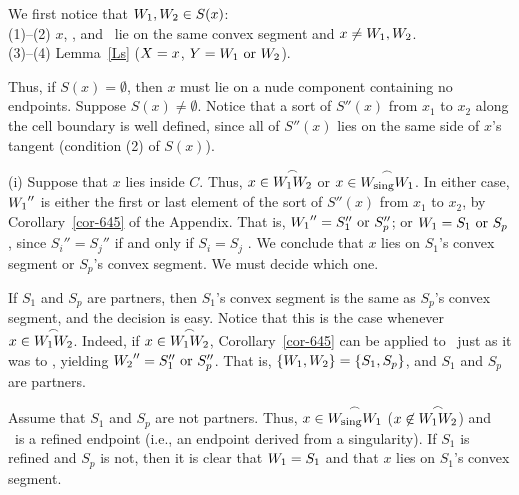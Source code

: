 We first notice that $\mbox{$W_{1}$},\mbox{$W_{2}$} \in S(x)$:\\
\indent (1)--(2) $x$, \wo, and \wt\ lie on the same convex segment 
and $x \neq \mbox{$W_{1}$},\mbox{$W_{2}$}$.\\
\indent (3)--(4) Lemma~\ref{Ls} ($X = x$, $Y = \mbox{$W_{1}$} \mbox{ or } \mbox{$W_{2}$}$).

\noindent Thus, if $S(x) = \emptyset$, then $x$ must lie on a nude 
component containing 
no endpoints.
%
%
Suppose $S(x) \neq \emptyset$.
Notice that a sort of $S''(x)$ 
from $x_{1}$ to $x_{2}$ along the cell boundary is well defined, 
since all of $S''(x)$ lies on the same side of $x$'s tangent
(condition (2) of $S(x)$).

(i) Suppose that $x$ lies inside $C$.
Thus, $x \in \mbox{$\stackrel{\frown}{\mbox{$W_{1}$}\mbox{$W_{2}$}}$}$ or 
$x \in \mbox{$\stackrel{\frown}{W_{\mbox{\footnotesize{sing}}}\mbox{$W_{1}$}}$}$.
In either case, 
$\mbox{$W_{1}$}''$ is either the first or last element of the sort of $S''(x)$
from $x_{1}$ to $x_{2}$, by Corollary~\ref{cor-645} of the Appendix.
That is, $\mbox{$W_{1}$}'' = S_{1}'' \mbox{ or } S_{p}''$; or
$\mbox{$W_{1}$} = S_{1} \mbox{ or } S_{p}$, 
since $S_{i}'' = S_{j}''$ if and only if $S_{i}=S_{j}$ \cite[p. 75]{jj}.
We conclude that $x$ lies on $S_{1}$'s convex segment or 
$S_{p}$'s convex segment.
We must decide which one.

If $S_{1}$ and $S_{p}$ are partners, then $S_{1}$'s convex segment is 
the same as
$S_{p}$'s convex segment, and the decision is easy.
Notice that this is the case whenever $x \in \mbox{$\stackrel{\frown}{\mbox{$W_{1}$}\mbox{$W_{2}$}}$}$.
Indeed, if $x \in \mbox{$\stackrel{\frown}{\mbox{$W_{1}$}\mbox{$W_{2}$}}$}$,
Corollary~\ref{cor-645} can be applied to \wt\ just as it was to \wo, 
yielding
$\mbox{$W_{2}$}'' = S_{1}'' \mbox{ or } S_{p}''$.
That is, $\{\mbox{$W_{1}$},\mbox{$W_{2}$}\} = \{S_{1},S_{p}\}$, and $S_{1}$ and $S_{p}$ are 
partners.

Assume that $S_{1}$ and $S_{p}$ are not partners.
Thus, $x \in \mbox{$\stackrel{\frown}{W_{\mbox{\footnotesize{sing}}}\mbox{$W_{1}$}}$}$ 
($x \not\in \mbox{$\stackrel{\frown}{\mbox{$W_{1}$}\mbox{$W_{2}$}}$}$)
and  \wo\ is a refined endpoint (i.e., an endpoint derived from a 
singularity).
If $S_{1}$ is refined and $S_{p}$ is not, then it is clear that 
$\mbox{$W_{1}$} = S_{1}$ and that
$x$ lies on $S_{1}$'s convex segment.

